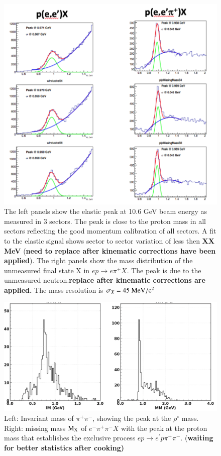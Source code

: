 \documentclass[final,3p,twocolumn]{elsarticle}
\begin{document}
\begin{figure}[htbp!]
\centerline{\includegraphics[width=1.0\columnwidth]{elastic_pi+n.png}}
\caption{ The left panels show the elastic peak at 10.6 GeV beam energy as measured in 3 sectors. The peak is close to the proton mass 
in all sectors reflecting the good momentum calibration of all sectors. A fit to the elastic signal shows sector to sector variation of less 
then {\bf XX MeV} ({\bf need to replace after kinematic corrections have been applied}). The right panels show the mass distribution of 
the unmeasured final state X in $ep \to e\pi^+ X$. The peak is due to the unmeasured neutron.{\bf replace after kinematic corrections 
are applied.} The mass resolution is $\sigma_X = \rm 45~MeV/c^2$} 
\label{elastic-peak}
\end{figure} 

\begin{figure}[htbp!]
\centerline{\includegraphics[width=1.0\columnwidth]{pip-pim-p.png}}
\caption{Left: Invariant mass of $\pi^+\pi^-$, showing the peak at the $\rho^\circ$ mass. Right: missing mass 
$\rm M_X$  of $e^-\pi^+\pi^-X$ 
with the peak at the proton mass that establishes the exclusive process $ep\to e^\prime p \pi^+\pi^-$. ({\bf waiting for better statistics after cooking)}}
\label{pip-pim-p}
\end{figure} 
\end{document}
